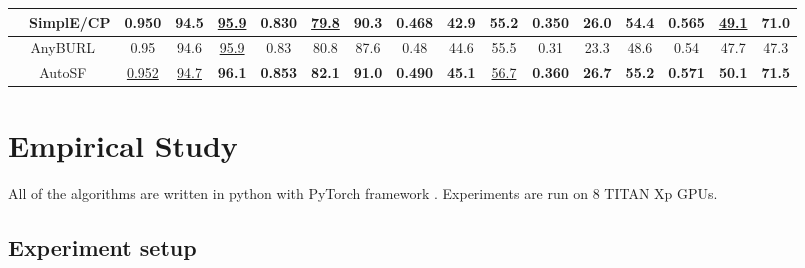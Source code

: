\documentclass[conference]{IEEEtran}
\begin{document}
\begin{table*}[ht]
\begin{tabular}{c|c|ccc|ccc|ccc|ccc|ccc}
		&                SimplE/CP                &       0.950        &   94.5   & \underline{95.9} &      0.830        &   \underline{79.8}    &      {90.3}      &      {0.468}         &   42.9    &       55.2       &      {0.350}    &    26.0    &       54.4       &       0.565      &   \underline{49.1}   & {71.0} \\ \hline\hline
		\multicolumn{2}{c|}{AnyBURL \cite{meilicke2019anytime}}       &  0.95 & 94.6 &  \underline{95.9}  & 0.83   &  80.8 &  87.6  &  0.48  & 44.6   &  55.5   &  0.31   &  23.3 &    48.6       &   0.54  &  47.7   &  47.3        \\ \hline \hline
		\multicolumn{2}{c|}{AutoSF}          & \underline{0.952}    &   \underline{94.7}    &  \textbf{96.1}   &  \textbf{0.853}     &  \textbf{82.1}   & \textbf{91.0} &  \textbf{0.490}      &   \textbf{45.1}   &  \underline{56.7}   &  \textbf{0.360}    &    \textbf{26.7}  &  \textbf{55.2}   &  \textbf{0.571}     &  \textbf{50.1}  &  \textbf{71.5}   \\ \hline
	\end{tabular}
	\vspace{-13px}
\end{table*}

\section{Empirical Study}

All of the algorithms are written in python with PyTorch framework \cite{paszke2017automatic}.
Experiments are run
on 8 TITAN Xp GPUs. 


\subsection{Experiment setup}
\label{ssec:setup}
\end{document}
